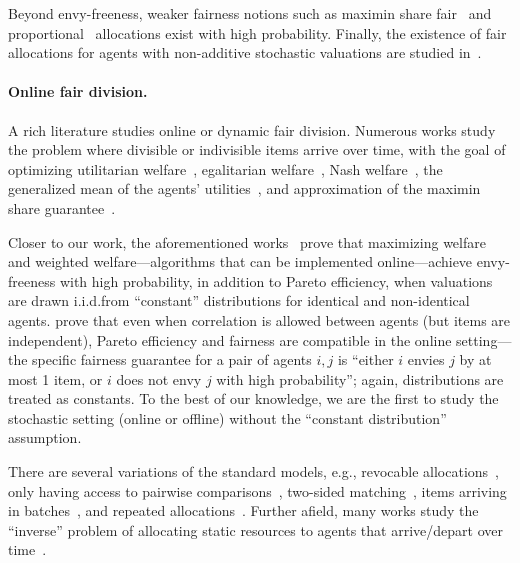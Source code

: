 Beyond envy-freeness, weaker fairness notions such as maximin share fair~\cite{kurokawa2016can,amanatidis2017approximation,farhadi2019fair} and proportional~\cite{suksompong2016asymptotic} allocations exist with high probability. Finally, the existence of fair allocations for agents with non-additive stochastic valuations are studied in~\cite{manurangsi2021closing,gan2019envy,benade2024existence}.


\paragraph{Online fair division.}
A rich literature studies online or dynamic fair division. Numerous works study the problem where divisible or indivisible items arrive over time, with the goal of optimizing utilitarian welfare~\cite{gkatzelis2021fair,bogomolnaia2022fair}, egalitarian welfare~\cite{springer2022online,kawase2022online}, Nash welfare~\cite{gao2021online,banerjee2022online,liao2022nonstationary,huang2023online,yang2024online}, the generalized mean of the agents' utilities~\cite{barman2022universal}, and approximation of the maximin share guarantee~\cite{zhou2023multi}.

Closer to our work, the aforementioned works~\cite{dickerson2014computational,bai2021envy} prove that maximizing welfare and weighted welfare---algorithms that can be implemented online---achieve envy-freeness with high probability, in addition to Pareto efficiency, when valuations are drawn i.i.d.\@ from ``constant'' distributions for identical and non-identical agents. \citet{benade2024fair} prove that even when correlation is allowed between agents (but items are independent), Pareto efficiency and fairness are compatible in the online setting---the specific fairness guarantee for a pair of agents $i,j$ is ``either $i$ envies $j$ by at most 1 item, or $i$ does not envy $j$ with high probability''; again, distributions are treated as constants. To the best of our knowledge, we are the first to study the stochastic setting (online or offline) without the ``constant distribution'' assumption.



There are several variations of the standard models, e.g., revocable allocations~\cite{he2019achieving,yang2023fairly}, only having access to pairwise comparisons~\cite{benade2025dynamic}, two-sided matching~\cite{mertzanidis2024}, items arriving in batches~\cite{benade2018make}, and repeated allocations~\cite{igarashi2024repeated}. Further afield, many works study the ``inverse'' problem of allocating static resources to agents that arrive/depart over time~\cite{kash2014no,li2018dynamic,sinclair2022sequential,vardi2022dynamic,banerjee2023online}.